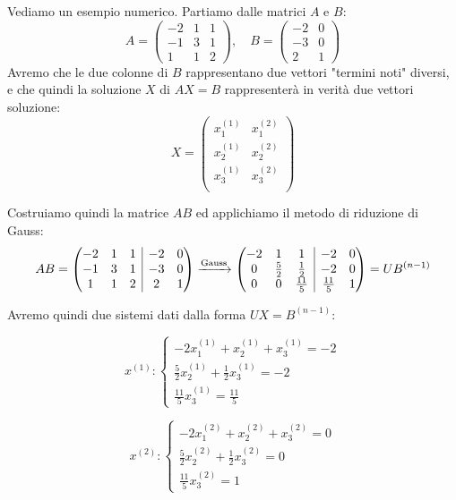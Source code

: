 \documentclass[a4paper,11pt]{article}
\begin{document}
\par\smallskip

Vediamo un esempio numerico.
Partiamo dalle matrici $A$ e $B$:
$$
A = \begin{pmatrix}
	-2 & 1 & 1 \\ 
	-1 & 3 & 1 \\ 
	1 & 1 & 2
\end{pmatrix}, \quad B = \begin{pmatrix}
	-2 & 0 \\ 
	-3 & 0 \\ 
	2 & 1
\end{pmatrix}
$$
Avremo che le due colonne di $B$ rappresentano due vettori "termini noti" diversi, e che quindi la soluzione $X$ di $AX = B$ rappresenterà in verità due vettori soluzione:
$$
X = \begin{pmatrix}
	x_1^{(1)} & x_1^{(2)} \\
	x_2^{(1)} & x_2^{(2)} \\
	x_3^{(1)} & x_3^{(2)} \\
\end{pmatrix}
$$

Costruiamo quindi la matrice $AB$ ed applichiamo il metodo di riduzione di Gauss:
$$
AB = 
\left(\begin{array}{@{}c c c | c c@{}}
	-2 & 1 & 1 & -2 & 0 \\
	-1 & 3 & 1 & -3 & 0 \\
	1 & 1 & 2 & 2 & 1
\end{array}\right) \xrightarrow{\text{Gauss}}
\left(\begin{array}{@{}c c c | c c@{}}
	-2 & 1 & 1 & -2 & 0 \\
	0 & \frac{5}{2} & \frac{1}{2} & -2 & 0 \\ 
	0 & 0 & \frac{11}{5} & \frac{11}{5} & 1
\end{array}\right) = UB^{(n - 1)}
$$

Avremo quindi due sistemi dati dalla forma $UX = B^{(n - 1)}$:

\begin{minipage}{0.45\textwidth}

	\[
		x^{(1)} :
		\begin{cases}
			-2 x_1^{(1)} + x_2^{(1)} + x_3^{(1)} = -2 \\ 
			\frac{5}{2} x_2^{(1)} + \frac{1}{2} x_3^{(1)} = -2 \\ 
			\frac{11}{5} x_3^{(1)} = \frac{11}{5}
		\end{cases}
	\]

\end{minipage}%
\hfill %
\begin{minipage}{0.45\textwidth}

	\[
		x^{(2)} :
		\begin{cases}
			-2 x_1^{(2)} + x_2^{(2)} + x_3^{(2)} = 0 \\ 
			\frac{5}{2} x_2^{(2)} + \frac{1}{2} x_3^{(2)} = 0 \\ 
			\frac{11}{5} x_3^{(2)} = 1
		\end{cases}
	\]

\end{minipage}
\end{document}
